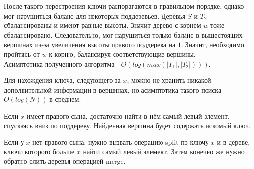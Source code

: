 \documentclass[12pt]{article}
\newenvironment{problem}[2][Задача]{\begin{trivlist}
\item[\hskip \labelsep {\bfseries #1}\hskip \labelsep {\bfseries #2.}]}{\end{trivlist}}
\begin{document}
\begin{problem}{1}
     После такого перестроения ключи распорагаются в правильном порядке,
     однако мог нарушиться баланс для некоторых поддеревьев. 
     Деревья $S$ и $T_2$ сбалансированы и имеют равные высоты.
     Значит дерево с корнем $w$ тоже сбалансировано. Следовательно, мог
     нарушиться только баланс в вышестоящих вершинах из-за увеличения высоты
     правого поддерева на $1$. Значит, необходимо пройтись от $w$ к корню, 
     балансируя соответствующие вершины.\\

     Асимптотика полученного алгоритма - $O(log(max(|T_1|, |T_2|)))$. 

\end{problem}


\begin{problem}{4a}
    Для нахождения ключа, следующего за $x$, можно не хранить никакой 
    дополнительной информации в вершинах, но асимптотика такого поиска -
    $O(log(N))$ в среднем.

    Если $x$ имеет правого сына, достаточно найти в нём самый левый элемент,
    спускаясь вниз по поддереву. Найденная вершина  будет содержать искомый ключ.

    Если у $x$ нет правого сына. нужно вызвать операцию split по ключу $x$ и в 
    дереве, ключи которого больше $x$ найти самый левый элемент. Затем конечно
    же нужно обратно слить деревья операцией merge.
\end{problem}
\end{document}
